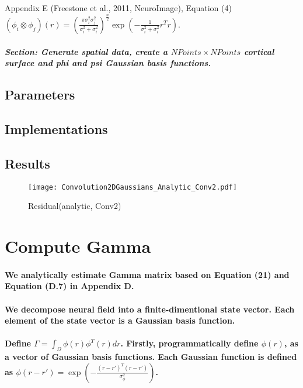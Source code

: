 \documentclass[a4paper, 12pt, english]{article}
\begin{document}
Appendix E (Freestone et al., 2011, NeuroImage), Equation (4) $\left(\phi_{i}\otimes\phi_{j}\right)(r)=(\frac{\pi\sigma_{i}^{2}\sigma_{j}^{2}}{\sigma_{i}^{2}+\sigma_{i}^{2}})^{\frac{n}{2}}\exp(-\frac{1}{\sigma_{i}^{2}+\sigma_{i}^{2}}r^{T}r)$.

\subparagraph{Section: Generate spatial data, create a $NPoints\times NPoints$ cortical surface and phi and psi Gaussian basis functions.\\}


\subsection{Parameters}



\subsection{Implementations}



\subsection{Results}
\begin{figure}[H]
\centering
\texttt{[image: Convolution2DGaussians\_Analytic\_Conv2.pdf]}
\caption{Residual(analytic, Conv2)}\label{Convolution2DGaussians_Analytic_Conv2.pdf}
\end{figure}



\newpage




\section{Compute Gamma}

\paragraph{We analytically estimate Gamma matrix based on Equation (21) and Equation
(D.7) in Appendix D.}

\paragraph{We decompose neural field into a finite-dimentional state vector. Each element
of the state vector is a Gaussian basis function.}

\paragraph{Define $\Gamma=\int_{\Omega}\phi(r)\phi^{T}(r)dr$. Firstly, programmatically
define $\phi(r)$, as a vector of Gaussian basis functions. Each Gaussian
function is defined as $\phi(r-r')=\exp{(-\frac{(r-r')^{T}(r-r')}{\sigma_{\phi}^{2}})}$.}
\end{document}
